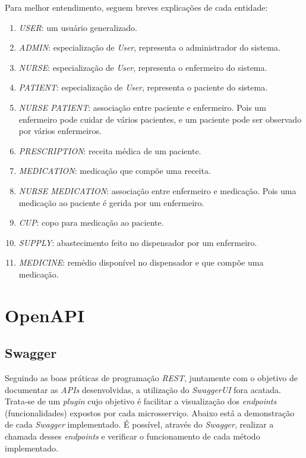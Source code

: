 \begin{apendicesenv}
Para melhor entendimento, seguem breves explicações de cada entidade:

\begin{enumerate}
  \item \textit{USER}: um usuário generalizado.
  \item \textit{ADMIN}: especialização de \textit{User}, representa o administrador do sistema.
  \item \textit{NURSE}: especialização de \textit{User}, representa o enfermeiro do sistema.
  \item \textit{PATIENT}: especialização de \textit{User}, representa o paciente do sistema.
  \item \textit{NURSE PATIENT}: associação entre paciente e enfermeiro. Pois um enfermeiro pode cuidar de vários pacientes, e um paciente pode ser observado por vários enfermeiros.
  \item \textit{PRESCRIPTION}: receita médica de um paciente.
  \item \textit{MEDICATION}: medicação que compõe uma receita.
  \item \textit{NURSE MEDICATION}: associação entre enfermeiro e medicação. Pois uma medicação ao paciente é gerida por um enfermeiro.
  \item \textit{CUP}: copo para medicação ao paciente.
  \item \textit{SUPPLY}: abastecimento feito no dispensador por um enfermeiro.
  \item \textit{MEDICINE}: remédio disponível no dispensador e que compõe uma medicação.
\end{enumerate}

\chapter{OpenAPI}\label{OpenAPI} %

\section{Swagger}
Seguindo as boas práticas de programação \textit{REST}, juntamente com o objetivo de documentar as \textit{APIs} desenvolvidas, a utilização do \textit{SwaggerUI} fora acatada. Trata-se de um \textit{plugin} cujo objetivo é facilitar a visualização dos \emph{endpoints} (funcionalidades) expostos por cada microsserviço. Abaixo está a demonstração de cada \textit{Swagger} implementado. É possível, através do \textit{Swagger}, realizar a chamada desses \emph{endpoints} e verificar o funcionamento de cada método implementado. 


\end{apendicesenv}
